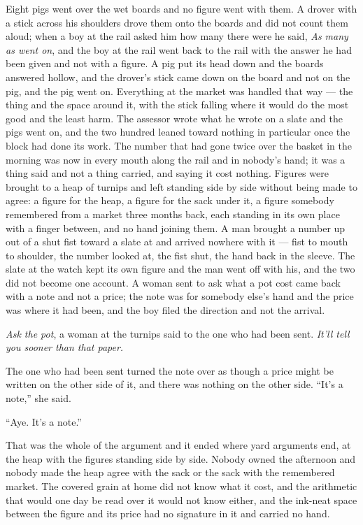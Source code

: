 Eight pigs went over the wet boards and no figure went with them. A drover with a stick across his shoulders drove them onto the boards and did not count them aloud; when a boy at the rail asked him how many there were he said, \emph{As many as went on}, and the boy at the rail went back to the rail with the answer he had been given and not with a figure. A pig put its head down and the boards answered hollow, and the drover's stick came down on the board and not on the pig, and the pig went on. Everything at the market was handled that way --- the thing and the space around it, with the stick falling where it would do the most good and the least harm. The assessor wrote what he wrote on a slate and the pigs went on, and the two hundred leaned toward nothing in particular once the block had done its work. The number that had gone twice over the basket in the morning was now in every mouth along the rail and in nobody's hand; it was a thing said and not a thing carried, and saying it cost nothing. Figures were brought to a heap of turnips and left standing side by side without being made to agree: a figure for the heap, a figure for the sack under it, a figure somebody remembered from a market three months back, each standing in its own place with a finger between, and no hand joining them. A man brought a number up out of a shut fist toward a slate at  and arrived nowhere with it --- fist to mouth to shoulder, the number looked at, the fist shut, the hand back in the sleeve. The slate at the watch kept its own figure and the man went off with his, and the two did not become one account. A woman sent to ask what a pot cost came back with a note and not a price; the note was for somebody else's hand and the price was where it had been, and the boy filed the direction and not the arrival.

\emph{Ask the pot}, a woman at the turnips said to the one who had been sent. \emph{It'll tell you sooner than that paper.}

The one who had been sent turned the note over as though a price might be written on the other side of it, and there was nothing on the other side. “It's a note,” she said.

“Aye. It's a note.”

That was the whole of the argument and it ended where yard arguments end, at the heap with the figures standing side by side. Nobody owned the afternoon and nobody made the heap agree with the sack or the sack with the remembered market. The covered grain at home did not know what it cost, and the arithmetic that would one day be read over it would not know either, and the ink-neat space between the figure and its price had no signature in it and carried no hand.

